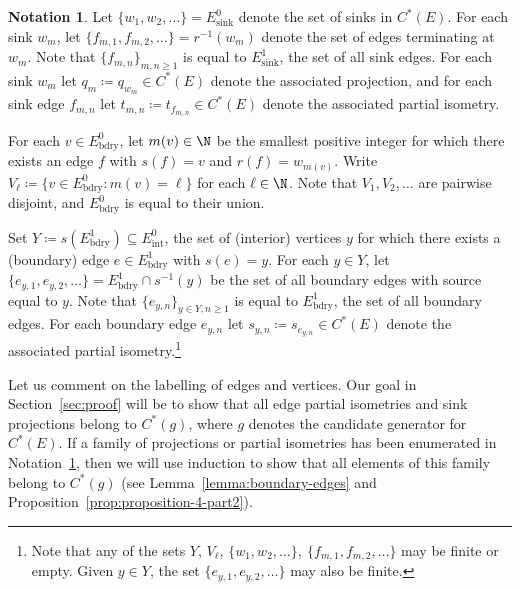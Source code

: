 \documentclass[12pt, a4paper]
{amsart}
\theoremstyle{definition}
\newtheorem{notation}[thm]{Notation}
\theoremstyle{remark}
\numberwithin{equation}{section}
\newcommand{\Esink}{E^0_{\mathrm{sink}}}
\newcommand{\Eboundary}{E^0_{\mathrm{bdry}}}
\newcommand{\Eint}{E^0_{\mathrm{int}}}
\newcommand{\edgesink}{E^1_{\mathrm{sink}}}
\newcommand{\edgebdy}{E^1_{\mathrm{bdry}}}
\newcommand{\Cstar}{\ensuremath{C^*}}
\begin{document}
\begin{notation}\label{label}
    Let $\{w_1, w_2, \dots\} = \Esink$ denote the set of sinks in $\Cstar(E)$. For each sink $w_m$, let $\{f_{m,1}, f_{m,2}, \dots\} = r^{-1}(w_m)$ denote the set of edges terminating at $w_m$. Note that $\{f_{m,n}\}_{m,n \ge 1}$ is equal to $\edgesink$, the set of all sink edges. For each sink $w_m$ let ${q_m \coloneq q_{w_{m}} \in \Cstar(E)}$ denote the associated projection, and for each sink edge $f_{m,n}$ let $t_{m,n} \coloneq t_{f_{m,n}} \in \Cstar(E)$ denote the associated partial isometry.

    For each $v \in \Eboundary$, let $m(v) \in \N$ be the smallest positive integer for which there exists an edge $f$ with $s(f) = v$ and $r(f) = w_{m(v)}$. Write $V_\ell \coloneq \{ v \in \Eboundary \colon m(v) = \ell\}$ for each $\ell \in \N$. Note that $V_1, V_2, \dots$ are pairwise disjoint, and $\Eboundary$ is equal to their union. 

    Set $Y \coloneq s(\edgebdy) \subseteq \Eint$, the set of (interior) vertices $y$ for which there exists a (boundary) edge $e \in \edgebdy$ with $s(e) = y$. For each $y \in Y$, let ${\{e_{y, 1},e_{y, 2}, \dots \} = \edgebdy \cap s^{-1}(y)}$ be the set of all boundary edges with source equal to $y$. Note that $\{e_{y,n}\}_{y \in Y, n \ge 1}$ is equal to $\edgebdy$, the set of all boundary edges. For each boundary edge $e_{y,n}$ let $s_{y,n} \coloneq s_{e_{y,n}} \in \Cstar(E)$ denote the associated partial isometry.\footnote{Note that any of the sets $Y$, $V_\ell$, $\{w_1, w_2, \dots\}, \ \{f_{m,1}, f_{m,2}, \dots\}$ may be finite or empty. Given $y \in Y$, the set $\{e_{y, 1},e_{y, 2}, \dots \}$ may also be finite.}
\end{notation}

Let us comment on the labelling of edges and vertices. Our goal in Section~\ref{sec:proof} will be to show that all edge partial isometries and sink projections belong to $\Cstar(g)$, where $g$ denotes the candidate generator for $\Cstar(E)$. If a family of projections or partial isometries has been enumerated in Notation~\ref{label}, then we will use induction to show that all elements of this family belong to $\Cstar(g)$ (see Lemma~\ref{lemma:boundary-edges} and Proposition~\ref{prop:proposition-4-part2}).
\end{document}
